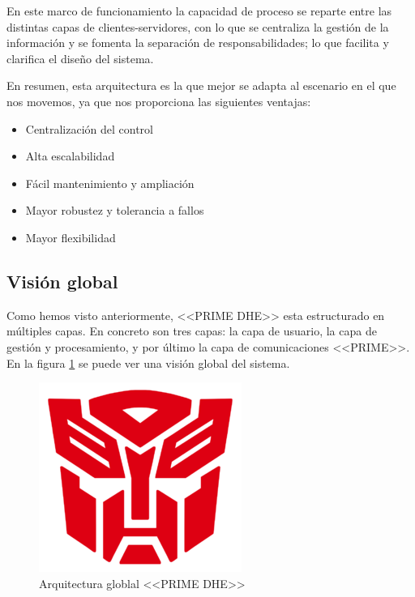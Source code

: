 En este marco de funcionamiento la capacidad de proceso se reparte entre las distintas capas de clientes-servidores, con lo que se centraliza la gestión de la información y se fomenta la separación de responsabilidades; lo que facilita y clarifica el diseño del sistema.
 
 En resumen, esta arquitectura es la que mejor se adapta al escenario en el que nos movemos, ya que nos proporciona las siguientes ventajas:
 \begin{itemize}
 	\item Centralización del control
 	\item Alta escalabilidad
 	\item Fácil mantenimiento y ampliación
 	\item Mayor robustez y tolerancia a fallos
 	\item Mayor flexibilidad
 \end{itemize}

\subsection{Visión global}
Como hemos visto anteriormente, <<PRIME DHE>> esta estructurado en múltiples capas. En concreto son tres capas: la capa de usuario, la capa de gestión y procesamiento, y por último la capa de comunicaciones <<PRIME>>. En la figura \ref{fig:ArquitecturaDHEVisionGlobal} se puede ver una visión global del sistema.

\begin{figure}[htbp]
	\centering
	\includegraphics[width=\textwidth]{Img/dummy.png}
	\caption{Arquitectura globlal <<PRIME DHE>>}
	\label{fig:ArquitecturaDHEVisionGlobal}
\end{figure}

